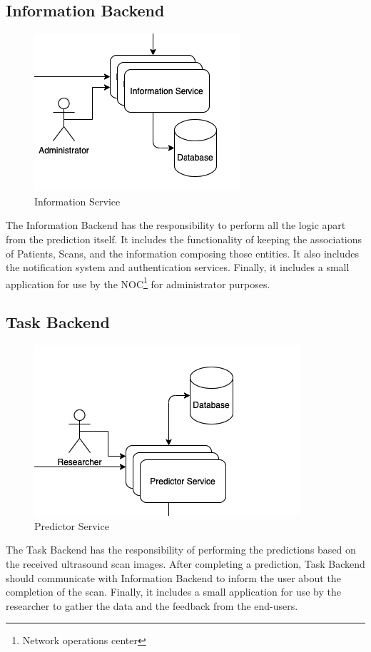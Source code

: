 		\subsection{Information Backend}
			\begin{figure}[H]
				\iftrue
				\caption{Information Service}
				\centering
				\includegraphics[scale=0.5]{figures/infobe}
				\fi
			\end{figure}
			The Information Backend has the responsibility to perform all the logic apart from the prediction itself. It
			 includes the functionality of keeping the associations of Patients, Scans, and the information composing those 
			 entities. It also includes the notification system and authentication services. Finally, it includes a small 
			 application for use by the NOC\footnote{Network operations center}  for administrator purposes.
		\subsection{Task Backend}
			\begin{figure}[H]
				\iftrue
				\caption{Predictor Service}
				\centering
				\includegraphics[scale=0.5]{figures/taskbe}
				\fi
			\end{figure}
			The Task Backend has the responsibility of performing the predictions based on the received ultrasound scan images. 
			After completing a prediction, Task Backend should communicate with Information Backend to inform the user about the 
			completion of the scan. Finally, it includes a small application for use by the researcher to gather the data and the 
			feedback from the end-users.
	
		
				
					
			
		
	
